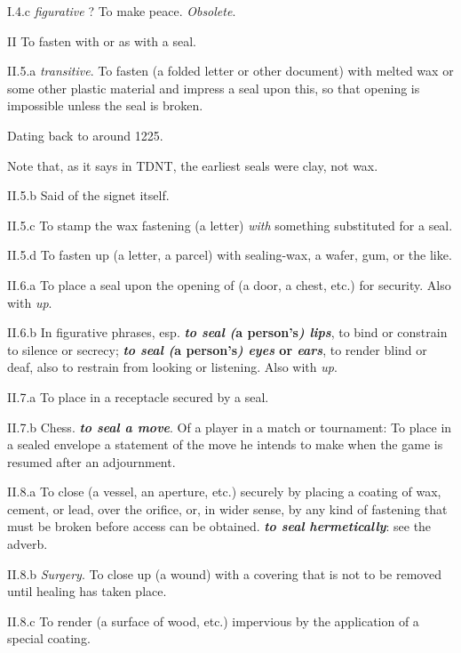 \begin{compactitem}
		\item[I.4.c] \textit{figurative} ? To make peace. \textit{Obsolete}.
		\item[II] To fasten with or as with a seal.
		\item[II.5.a] \textit{transitive}. To fasten (a folded letter or other document) with melted wax or some other plastic material and impress a seal upon this, so that opening is impossible unless the seal is broken.
			\begin{compactitem}
				\item Dating back to around 1225.
				\item Note that, as it says in TDNT, the earliest seals were clay, not wax.
			\end{compactitem}
		\item[II.5.b] Said of the signet itself.
		\item[II.5.c] To stamp the wax fastening (a letter) \textit{with} something substituted for a seal.
		\item[II.5.d] To fasten up (a letter, a parcel) with sealing-wax, a wafer, gum, or the like.
		\item[II.6.a] To place a seal upon the opening of (a door, a chest, etc.) for security. Also with \textit{up}.
		\item[II.6.b] In figurative phrases, esp. \textbf{\textit{to seal (}a person's\textit{) lips}}, to bind or constrain to silence or secrecy; \textbf{\textit{to seal (}a person's\textit{) eyes} or \textit{ears}}, to render blind or deaf, also to restrain from looking or listening. Also with \textit{up}.
		\item[II.7.a] To place in a receptacle secured by a seal.
		\item[II.7.b] Chess. \textbf{\textit{to seal a move}}. Of a player in a match or tournament: To place in a sealed envelope a statement of the move he intends to make when the game is resumed after an adjournment.
		\item[II.8.a] To close (a vessel, an aperture, etc.) securely by placing a coating of wax, cement, or lead, over the orifice, or, in wider sense, by any kind of fastening that must be broken before access can be obtained. \textbf{\textit{to seal hermetically}}: see the adverb.
		\item[II.8.b] \textit{Surgery}. To close up (a wound) with a covering that is not to be removed until healing has taken place.
		\item[II.8.c] To render (a surface of wood, etc.) impervious by the application of a special coating.

\end{compactitem}
